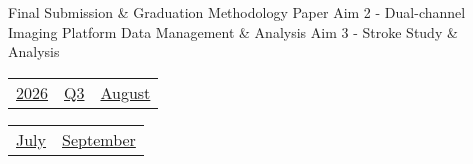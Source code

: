 \vfill{\centering{} \small{Final Submission \& Graduation}\hspace{ 1.5em } \small{Methodology Paper}\hspace{ 1.5em } \small{Aim 2 - Dual-channel Imaging Platform}\hspace{ 1.5em } \small{Data Management \& Analysis}\hspace{ 1.5em } \small{Aim 3 - Stroke Study \& Analysis}\hspace{ 1.5em }\par}

\pagebreak
{\noindent\Large\renewcommand{\arraystretch}{\myNumArrayStretch}\begin{tabular}{|l|l|l}
\hyperlink{2026}{2026} & \hyperlink{Q3}{Q3} & \hyperlink{August}{August}
\end{tabular}\hfill%
\begin{tabular}{r|r@{}}
\hyperlink{month-2026-7}{July} & \hyperlink{month-2026-9}{September}
\end{tabular}}
\myLineThick
